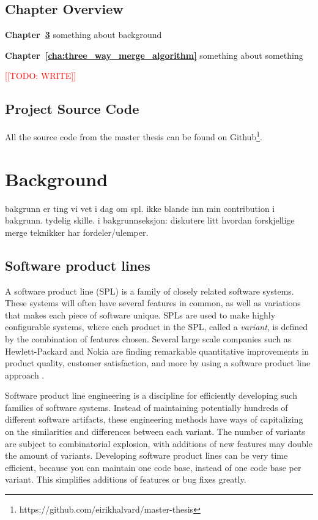 \documentclass[a4paper,english]{ifimaster}
\newcommand{\todo}[1]{\textcolor{red}{[[TODO: #1]]}\PackageWarning{TODO:}{#1!}}
\begin{document}
\section{Chapter Overview}%
\label{sec:chapter_overview}

\textbf{Chapter~\ref{cha:background}} something about background

\textbf{Chapter~\ref{cha:three_way_merge_algorithm}} something about something

\todo{WRITE}

\section{Project Source Code}%
\label{sec:project_source_code}

All the source code from the master thesis can be found on Github\footnote{https://github.com/eirikhalvard/master-thesis}.

\chapter{Background}%
\label{cha:background}

bakgrunn er ting vi vet i dag om spl. ikke blande inn min contribution i bakgrunn. tydelig skille.
i bakgrunnseksjon: diskutere litt hvordan forskjellige merge teknikker har fordeler/ulemper.

\section{Software product lines}%
\label{sec:software_product_lines}

A software product line (SPL) is a family of closely related software systems. These systems will often have several features in common, as well as variations that makes each piece of software unique. SPLs are used to make highly configurable systems, where each product in the SPL, called a \textit{variant}, is defined by the combination of features chosen. Several large scale companies such as Hewlett-Packard and Nokia are finding remarkable quantitative improvements in product quality, customer satisfaction, and more by using a software product line approach \cite{cite:northrop_spl_tenets}.

Software product line engineering is a discipline for efficiently developing such families of software systems. Instead of maintaining potentially hundreds of different software artifacts, these engineering methods have ways of capitalizing on the similarities and differences between each variant. The number of variants are subject to combinatorial explosion, with additions of new features may double the amount of variants. Developing software product lines can be very time efficient, because you can maintain one code base, instead of one code base per variant. This simplifies additions of features or bug fixes greatly.
\end{document}
